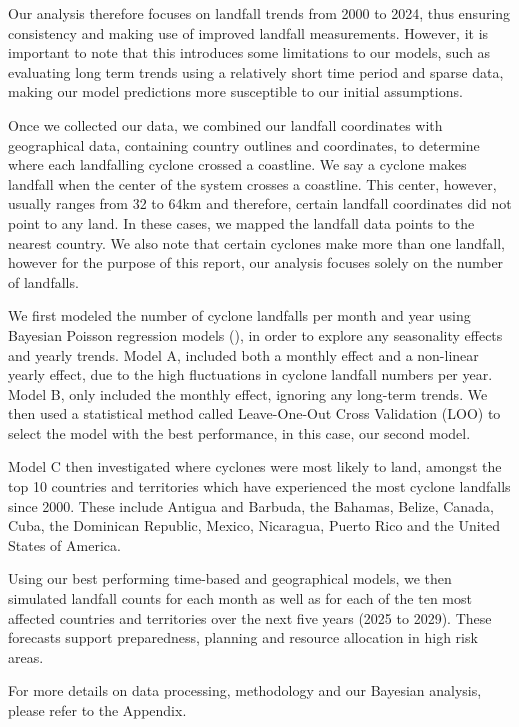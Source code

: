 \documentclass[
]{article}
\begin{document}
Our analysis therefore focuses on landfall trends from 2000 to 2024, thus ensuring consistency and making use of improved landfall measurements. However, it is important to note that this introduces some limitations to our models, such as evaluating long term trends using a relatively short time period and sparse data, making our model predictions more susceptible to our initial assumptions.

Once we collected our data, we combined our landfall coordinates with geographical data, containing country outlines and coordinates, to determine where each landfalling cyclone crossed a coastline. We say a cyclone makes landfall when the center of the system crosses a coastline. This center, however, usually ranges from 32 to 64km and therefore, certain landfall coordinates did not point to any land. In these cases, we mapped the landfall data points to the nearest country. We also note that certain cyclones make more than one landfall, however for the purpose of this report, our analysis focuses solely on the number of landfalls.

We first modeled the number of cyclone landfalls per month and year using Bayesian Poisson regression models (), in order to explore any seasonality effects and yearly trends. Model A, included both a monthly effect and a non-linear yearly effect, due to the high fluctuations in cyclone landfall numbers per year. Model B, only included the monthly effect, ignoring any long-term trends. We then used a statistical method called Leave-One-Out Cross Validation (LOO) to select the model with the best performance, in this case, our second model.

Model C then investigated where cyclones were most likely to land, amongst the top 10 countries and territories which have experienced the most cyclone landfalls since 2000. These include Antigua and Barbuda, the Bahamas, Belize, Canada, Cuba, the Dominican Republic, Mexico, Nicaragua, Puerto Rico and the United States of America.

Using our best performing time-based and geographical models, we then simulated landfall counts for each month as well as for each of the ten most affected countries and territories over the next five years (2025 to 2029). These forecasts support preparedness, planning and resource allocation in high risk areas.

For more details on data processing, methodology and our Bayesian analysis, please refer to the Appendix.
\end{document}
